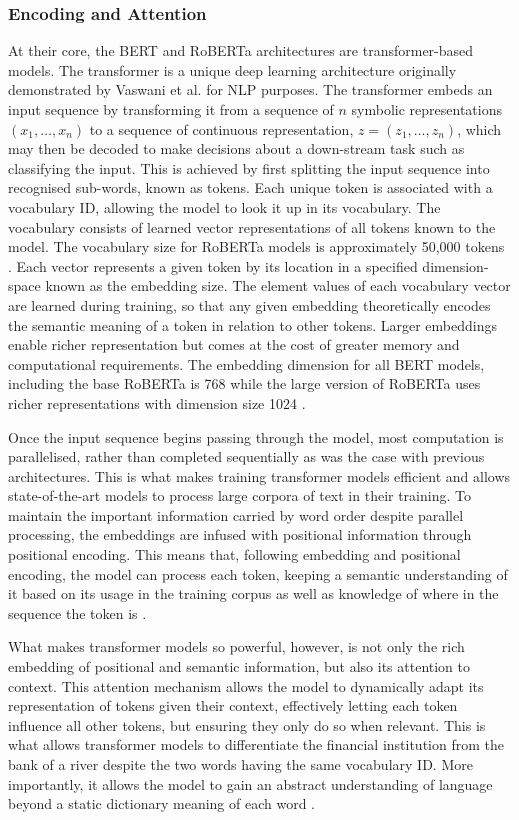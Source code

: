 \documentclass[12pt]{report}
\begin{document}
\subsubsection*{Encoding and Attention}
At their core, the BERT and RoBERTa architectures are transformer-based models.
The transformer is a unique deep learning architecture originally demonstrated by Vaswani et al. \citeyear{Vaswani2017} for NLP purposes.
The transformer embeds an input sequence by transforming it from a sequence of $n$ symbolic representations $(x_1, \ldots, x_n)$ to a sequence of continuous representation, $z = (z_1, \ldots, z_n)$, which may then be decoded to make decisions about a down-stream task such as classifying the input.
This is achieved by first splitting the input sequence into recognised sub-words, known as tokens.
Each unique token is associated with a vocabulary ID, allowing the model to look it up in its vocabulary.
The vocabulary consists of learned vector representations of all tokens known to the model.
The vocabulary size for RoBERTa models is approximately 50,000 tokens \cite{roberta}.
Each vector represents a given token by its location in a specified dimension-space known as the embedding size.
The element values of each vocabulary vector are learned during training, so that any given embedding theoretically encodes the semantic meaning of a token in relation to other tokens.
Larger embeddings enable richer representation but comes at the cost of greater memory and computational requirements.
The embedding dimension for all BERT models, including the base RoBERTa is 768 while the large version of RoBERTa uses richer representations with dimension size 1024 \cite{BERT,roberta}.

Once the input sequence begins passing through the model, most computation is parallelised, rather than completed sequentially as was the case with previous architectures.
This is what makes training transformer models efficient and allows state-of-the-art models to process large corpora of text in their training.
To maintain the important information carried by word order despite parallel processing, the embeddings are infused with positional information through positional encoding.
This means that, following embedding and positional encoding, the model can process each token, keeping a semantic understanding of it based on its usage in the training corpus as well as knowledge of where in the sequence the token is \cite{Vaswani2017}.

What makes transformer models so powerful, however, is not only the rich embedding of positional and semantic information, but also its attention to context.
This attention mechanism allows the model to dynamically adapt its representation of tokens given their context, effectively letting each token influence all other tokens, but ensuring they only do so when relevant.
This is what allows transformer models to differentiate the financial institution from the bank of a river despite the two words having the same vocabulary ID.
More importantly, it allows the model to gain an abstract understanding of language beyond a static dictionary meaning of each word \cite{Vaswani2017}.
\end{document}
